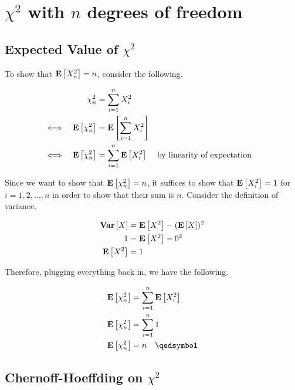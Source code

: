 \chapter{$\chi^2$ with $n$ degrees of freedom}

\section{Expected Value of $\chi^2$}

To show that $\mathbf{E}\left[X_n^2\right] = n$, consider the following.

\begin{equation*}
\begin{aligned}
	&& \chi^2_n &= \sum_{i=1}^n X_i^2 \\
	\iff && \mathbf{E}\left[\chi^2_n\right] &= \mathbf{E}\left[\sum_{i=1}^n X_i^2\right] \\
	\iff && \mathbf{E}\left[\chi^2_n\right] &= \sum_{i=1}^n \mathbf{E}\left[X_i^2\right] && \text{by linearity of expectation}
\end{aligned}
\end{equation*}

Since we want to show that $\mathbf{E}\left[\chi^2_n\right] = n$, it suffices to show that $\mathbf{E}\left[X_i^2\right] = 1$ for $i = 1, 2, \ldots, n$ in order to show that their sum is $n$. Consider the definition of variance.

\begin{equation*}
\begin{aligned}
	\mathbf{Var}\left[X\right] &= \mathbf{E}\left[X^2\right] - (\mathbf{E}\left[X\right])^2 \\
	1 &= \mathbf{E}\left[X^2\right] - 0^2 \\
	\mathbf{E}\left[X^2\right] &= 1
\end{aligned}
\end{equation*}

Therefore, plugging everything back in, we have the following.

\begin{equation*}
\begin{aligned}
	\ex{\chi^2_n} &= \sum_{i=1}^n \ex{X_i^2} \\
	\ex{\chi^2_n} &= \sum_{i=1}^n 1 \\
	\ex{\chi^2_n} &= n \quad\qedsymbol \\
\end{aligned}
\end{equation*}

\section{Chernoff-Hoeffding on $\chi^2$}


